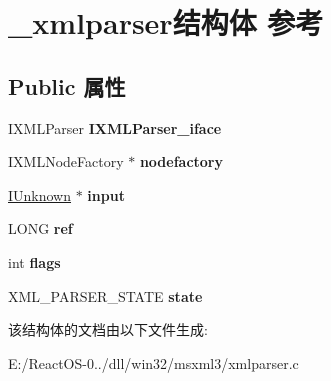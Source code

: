\hypertarget{struct__xmlparser}{}\section{\+\_\+xmlparser结构体 参考}
\label{struct__xmlparser}
\subsection*{Public 属性}
\begin{DoxyCompactItemize}
\item 
\mbox{\label{struct__xmlparser_a1d7fd91b799c4283b445b242867d8b81}} 
I\+X\+M\+L\+Parser {\bfseries I\+X\+M\+L\+Parser\+\_\+iface}
\item 
\mbox{\label{struct__xmlparser_a2c3058dc85bd9a8fe4f95dc29755b8b6}} 
I\+X\+M\+L\+Node\+Factory $\ast$ {\bfseries nodefactory}
\item 
\mbox{\label{struct__xmlparser_af59d8927e918e1360dfdc8ffc7329a87}} 
\hyperlink{interface_i_unknown}{I\+Unknown} $\ast$ {\bfseries input}
\item 
\mbox{\label{struct__xmlparser_a36f3c6bbe8bb40ee759a9da9071810ff}} 
L\+O\+NG {\bfseries ref}
\item 
\mbox{\label{struct__xmlparser_af5913c89f76a469c1627a559f7a20b38}} 
int {\bfseries flags}
\item 
\mbox{\label{struct__xmlparser_ae64d127d15aefbfc23086c3e218018a2}} 
X\+M\+L\+\_\+\+P\+A\+R\+S\+E\+R\+\_\+\+S\+T\+A\+TE {\bfseries state}
\end{DoxyCompactItemize}


该结构体的文档由以下文件生成\+:\begin{DoxyCompactItemize}
\item 
E\+:/\+React\+O\+S-\/0../dll/win32/msxml3/xmlparser.\+c\end{DoxyCompactItemize}
